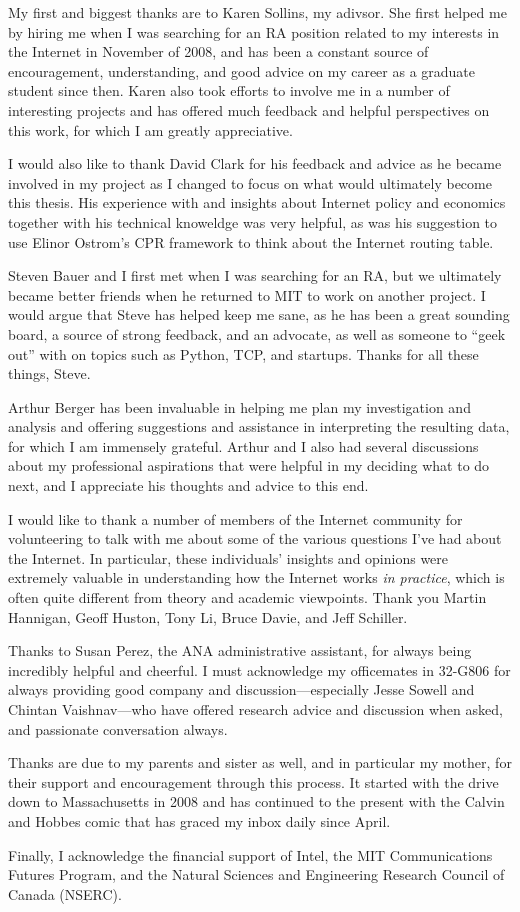 My first and biggest thanks are to Karen Sollins, my adivsor. She first helped me by hiring me when I was searching for an RA position related to my interests in the Internet in November of 2008, and has been a constant source of encouragement, understanding, and good advice on my career as a graduate student since then. Karen also took efforts to involve me in a number of interesting projects and has offered much feedback and helpful perspectives on this work, for which I am greatly appreciative.

I would also like to thank David Clark for his feedback and advice as he became involved in my project as I changed to focus on what would ultimately become this thesis. His experience with and insights about Internet policy and economics together with his technical knoweldge was very helpful, as was his suggestion to use Elinor Ostrom's CPR framework to think about the Internet routing table.

Steven Bauer and I first met when I was searching for an RA, but we ultimately became better friends when he returned to MIT to work on another project. I would argue that Steve has helped keep me sane, as he has been a great sounding board, a source of strong feedback, and an advocate, as well as someone to ``geek out'' with on topics such as Python, TCP, and startups. Thanks for all these things, Steve.

Arthur Berger has been invaluable in helping me plan my investigation and analysis and offering suggestions and assistance in interpreting the resulting data, for which I am immensely grateful. Arthur and I also had several discussions about my professional aspirations that were helpful in my deciding what to do next, and I appreciate his thoughts and advice to this end.

I would like to thank a number of members of the Internet community for volunteering to talk with me about some of the various questions I've had about the Internet. In particular, these individuals' insights and opinions were extremely valuable in understanding how the Internet works \emph{in practice}, which is often quite different from theory and academic viewpoints. Thank you Martin Hannigan, Geoff Huston, Tony Li, Bruce Davie, and Jeff Schiller.

Thanks to Susan Perez, the ANA administrative assistant, for always being incredibly helpful and cheerful. I must acknowledge my officemates in 32-G806 for always providing good company and discussion---especially Jesse Sowell and Chintan Vaishnav---who have offered research advice and discussion when asked, and passionate conversation always.

Thanks are due to my parents and sister as well, and in particular my mother, for their support and encouragement through this process. It started with the drive down to Massachusetts in 2008 and has continued to the present with the Calvin and Hobbes comic that has graced my inbox daily since April.

Finally, I acknowledge the financial support of Intel, the MIT Communications Futures Program, and the Natural Sciences and Engineering Research Council of Canada (NSERC).